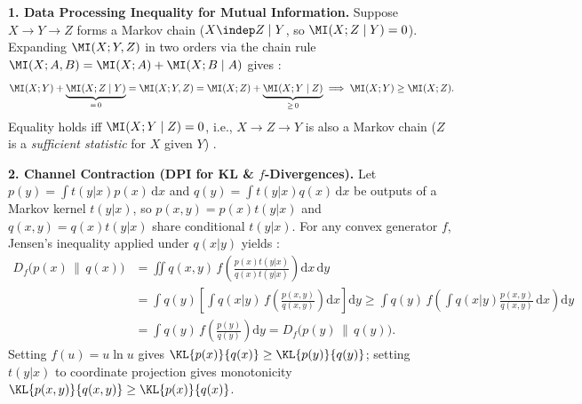 \documentclass[../../../../master.tex]{subfiles}
\begin{document}
\begin{coremath}
\label{cm:infotheory:dpi_fano}
\textbf{1. Data Processing Inequality for Mutual Information.} Suppose $X \to Y \to Z$ forms a Markov chain ($X \indep Z \mid Y$, so $\MI(X; Z \mid Y) = 0$). Expanding $\MI(X; Y, Z)$ in two orders via the chain rule $\MI(X; A, B) = \MI(X; A) + \MI(X; B \mid A)$ gives  :
\begin{equation}
\label{eq:infotheory:dpi_mi}
  \MI(X; Y) + \underbrace{\MI(X; Z \mid Y)}_{=\,0}
  = \MI(X; Y, Z)
  = \MI(X; Z) + \underbrace{\MI(X; Y \mid Z)}_{\ge\,0}
  \implies \MI(X; Y) \ge \MI(X; Z).
\end{equation}
Equality holds iff $\MI(X; Y \mid Z) = 0$, i.e., $X \to Z \to Y$ is also a Markov chain ($Z$ is a \emph{sufficient statistic} for $X$ given $Y$) .

\textbf{2. Channel Contraction (DPI for KL \& $f$-Divergences).} Let $p(y) = \int t(y|x)p(x)\,\mathrm{d}x$ and $q(y) = \int t(y|x)q(x)\,\mathrm{d}x$ be outputs of a Markov kernel $t(y|x)$, so $p(x, y) = p(x)t(y|x)$ and $q(x, y) = q(x)t(y|x)$ share conditional $t(y|x)$. For any convex generator $f$, Jensen's inequality applied under $q(x|y)$ yields :
\begin{align}
  D_f\bigl(p(x) \,\|\, q(x)\bigr)
  &= \iint q(x, y)\, f\!\left(\frac{p(x)t(y|x)}{q(x)t(y|x)}\right) \mathrm{d}x\,\mathrm{d}y \nonumber \\
  &= \int q(y) \left[ \int q(x|y)\, f\!\left(\frac{p(x, y)}{q(x, y)}\right) \mathrm{d}x \right] \mathrm{d}y
  \ge \int q(y)\, f\!\left(\int q(x|y)\frac{p(x, y)}{q(x, y)}\,\mathrm{d}x\right) \mathrm{d}y \nonumber \\
  &= \int q(y)\, f\!\left(\frac{p(y)}{q(y)}\right) \mathrm{d}y
  = D_f\bigl(p(y) \,\|\, q(y)\bigr). \label{eq:infotheory:dpi_fdiv}
\end{align}
Setting $f(u) = u\ln u$ gives $\KL{p(x)}{q(x)} \ge \KL{p(y)}{q(y)}$; setting $t(y|x)$ to coordinate projection gives monotonicity $\KL{p(x,y)}{q(x,y)} \ge \KL{p(x)}{q(x)}$.


\end{coremath}
\end{document}
